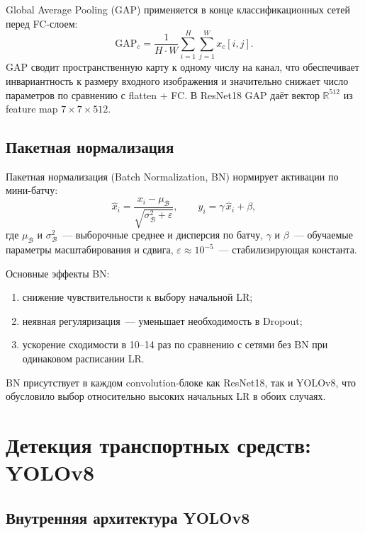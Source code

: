 \documentclass[14pt,a4paper]{report}
\numberwithin{equation}{chapter}
\numberwithin{figure}{chapter}
\numberwithin{table}{chapter}
\begin{document}
Global Average Pooling (GAP) применяется в конце классификационных
сетей перед FC-слоем:
\begin{equation}
  \mathrm{GAP}_c = \frac{1}{H\cdot W}
    \sum_{i=1}^{H}\sum_{j=1}^{W} x_c[i,j].
\end{equation}
GAP сводит пространственную карту к одному числу на канал,
что обеспечивает инвариантность к размеру входного изображения
и значительно снижает число параметров по сравнению с flatten + FC.
В ResNet18 GAP даёт вектор $\mathbb{R}^{512}$ из feature map
$7\times7\times512$.

\subsection{Пакетная нормализация}

Пакетная нормализация (Batch Normalization, BN) нормирует активации
по мини-батчу:
\begin{equation}
  \hat{x}_i = \frac{x_i - \mu_\mathcal{B}}
               {\sqrt{\sigma_\mathcal{B}^2 + \varepsilon}},
  \qquad
  y_i = \gamma\,\hat{x}_i + \beta,
\end{equation}
где $\mu_\mathcal{B}$ и $\sigma_\mathcal{B}^2$~--- выборочные
среднее и дисперсия по батчу, $\gamma$ и $\beta$~--- обучаемые
параметры масштабирования и сдвига, $\varepsilon \approx 10^{-5}$~---
стабилизирующая константа.

Основные эффекты BN:
\begin{enumerate}[nosep]
  \item снижение чувствительности к выбору начальной LR;
  \item неявная регуляризация~--- уменьшает необходимость в Dropout;
  \item ускорение сходимости в 10--14 раз по сравнению с сетями
    без BN при одинаковом расписании LR.
\end{enumerate}
BN присутствует в каждом convolution-блоке как ResNet18, так
и YOLOv8, что обусловило выбор относительно высоких начальных LR
в обоих случаях.

\section{Детекция транспортных средств: YOLOv8}

\subsection{Внутренняя архитектура YOLOv8}
\end{document}
